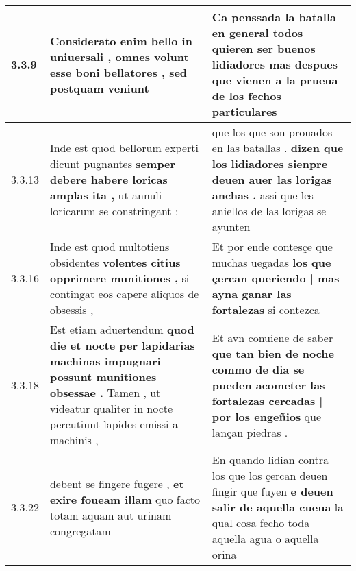 \begin{tabular}{|p{1cm}|p{6.5cm}|p{6.5cm}|}
3.3.9 & Considerato enim bello in uniuersali , \textbf{ omnes volunt esse boni bellatores , } sed postquam veniunt & Ca penssada la batalla en general \textbf{ todos quieren ser buenos lidiadores } mas despues que vienen a la prueua de los fechos particulares \\\hline
3.3.13 & Inde est quod bellorum experti dicunt pugnantes \textbf{ semper debere habere loricas amplas ita , } ut annuli loricarum se constringant : & que los que son prouados en las batallas . \textbf{ dizen que los lidiadores sienpre deuen auer las lorigas anchas . } assi que les aniellos de las lorigas se ayunten \\\hline
3.3.16 & Inde est quod multotiens obsidentes \textbf{ volentes citius opprimere munitiones , } si contingat eos capere aliquos de obsessis , & Et por ende contesçe que muchas uegadas \textbf{ los que çercan queriendo | mas ayna ganar las fortalezas } si contezca \\\hline
3.3.18 & Est etiam aduertendum \textbf{ quod die et nocte per lapidarias machinas impugnari possunt munitiones obsessae . } Tamen , ut videatur qualiter in nocte percutiunt lapides emissi a machinis , & Et avn conuiene de saber \textbf{ que tan bien de noche commo de dia se pueden acometer las fortalezas cercadas | por los engeñios } que lançan piedras . \\\hline
3.3.22 & debent se fingere fugere , \textbf{ et exire foueam illam } quo facto totam aquam aut urinam congregatam & En quando lidian contra los que los çercan deuen fingir que fuyen \textbf{ e deuen salir de aquella cueua } la qual cosa fecho toda aquella agua o aquella orina \\\hline

\end{tabular}
